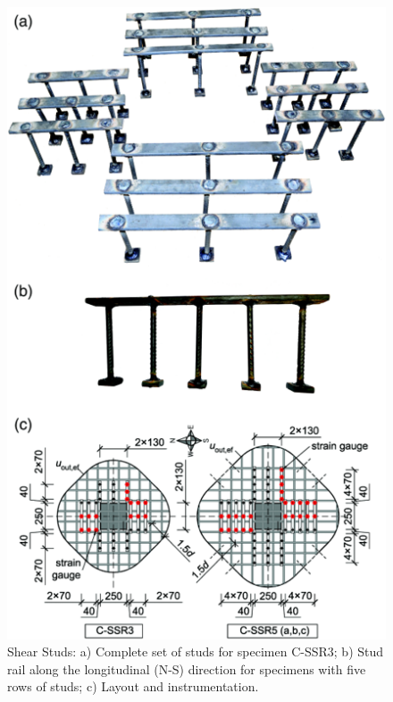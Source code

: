 \begin{figure}\centering
    \includegraphics[width=\columnwidth]{Figures/i2018f2.png}
    \caption{Shear Studs\citep{isufi2018}: a) Complete set of studs for specimen C-SSR3; b) Stud rail along the longitudinal (N-S) direction for specimens with five rows of studs; c) Layout and instrumentation.}
    \label{i2018f2}
    \end{figure}

